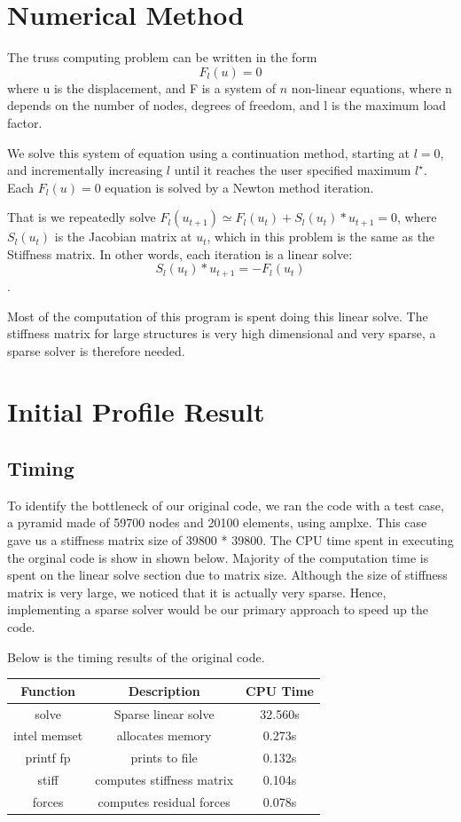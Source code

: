 \documentclass[11pt]{article}
\begin{document}
\section{Numerical Method}\label{sec:method}

The truss computing problem can be written in the form
$$F_l(u)=0$$
where u is the displacement, and F is a system of $n$ non-linear equations, where n depends on the number of nodes, degrees of freedom, and l is the maximum load factor.

We solve this system of equation using a continuation method, starting at $l=0$, and incrementally increasing $l$ until it reaches the user specified maximum $l^{\star}$. 
\\
Each $F_l(u)=0$ equation is solved by a Newton method iteration.

That is we repeatedly solve $F_l(u_{t+1}) \simeq F_l(u_t) + S_l(u_t)*u_{t+1} =0$, where $S_l(u_t)$ is the Jacobian matrix at $u_t$, which in this problem is the same as the Stiffness matrix. 
In other words, each iteration is a linear solve:
$$S_l(u_t)*u_{t+1}=-F_l(u_t)$$.

Most of the computation of this program is spent doing this linear solve. The stiffness matrix for large structures is very high dimensional and very sparse, a sparse solver is therefore needed.

\section{Initial Profile Result}\label{sec:profiling}

\subsection{Timing}
To identify the bottleneck of our original code, we ran the code with a test case, a pyramid made of 59700 nodes and 20100 elements, using amplxe. This case gave us a stiffness matrix size of 39800 * 39800. The CPU time spent in executing the orginal code is show in shown below. Majority of the computation time is spent on the linear solve section due to matrix size. Although the size of stiffness matrix is very large, we noticed that it is actually very sparse. Hence, implementing a sparse solver would be our primary approach to speed up the code. 

Below is the timing results of the original code. 
\begin{center}
	\begin{tabular}{||c c c ||} 
		\hline
		Function & Description & CPU Time \\ [0.5ex] 
		\hline\hline
		solve & Sparse linear solve & 32.560s  \\ 
		\hline
		intel memset  & allocates memory & 0.273s  \\
		\hline
		printf fp & prints to file & 0.132s  \\
		\hline
		stiff & computes stiffness matrix & 0.104s  \\
		\hline
		forces & computes residual forces & 0.078s  \\[1ex] 
		\hline
	\end{tabular}
\end{center}
\end{document}
